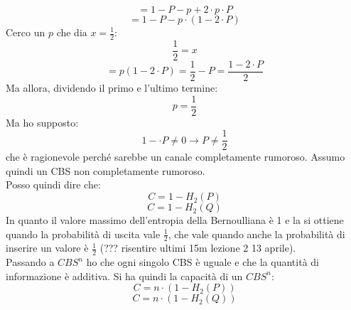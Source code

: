 \documentclass[a4paper,12pt, oneside]{book}
\begin{document}
\[=1-P-p+2\cdot p\cdot P\]
\[=1-P-p\cdot (1-2\cdot P)\]
Cerco un $p$ che dia $x=\frac{1}{2}$:
\[\frac{1}{2}=x\]
\[=p(1-2\cdot P)=\frac{1}{2}-P=\frac{1-2\cdot P}{2}\]
Ma allora, dividendo il primo e l'ultimo termine:
\[p=\frac{1}{2}\]
Ma ho supposto:
\[1-\cdot P\neq 0\to P\neq \frac{1}{2}\]
che è ragionevole perché sarebbe un canale completamente rumoroso. Assumo quindi
un CBS non completamente rumoroso.\\
Posso quindi dire che:
\[C=1-H_2(P)\]
\[C=1-H_2(Q)\]
In quanto il valore massimo dell'entropia della Bernoulliana è 1 e la si ottiene
quando la probabilità di uscita vale $\frac{1}{2}$, che vale quando anche la
probabilità di inserire un valore è $\frac{1}{2}$ (??? risentire ultimi 15m
lezione 2 13 aprile).\\
Passando a $CBS^n$ ho che ogni singolo CBS è uguale e che la quantità di
informazione è additiva. Si ha quindi la capacità di un $CBS^n$:
\[C=n\cdot \left(1-H_2(P)\right)\]
\[C=n\cdot \left(1-H_2(Q)\right)\]
\end{document}
